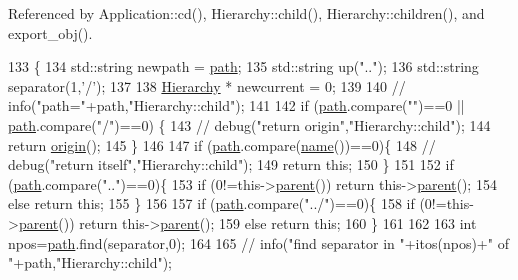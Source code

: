 Referenced by Application\+::cd(), Hierarchy\+::child(), Hierarchy\+::children(), and export\+\_\+obj().


\begin{DoxyCode}
133                                          \{
134   std::string newpath = \hyperlink{classHierarchy_aa7990fa7caf132d83e361ce033c6c65a}{path};
135   std::string up(\textcolor{stringliteral}{".."});
136   std::string separator(1,\textcolor{charliteral}{'/'});
137 
138   \hyperlink{classHierarchy}{Hierarchy} * newcurrent = 0;
139 
140   \textcolor{comment}{//  info("path="+path,"Hierarchy::child");}
141 
142   \textcolor{keywordflow}{if} (\hyperlink{classHierarchy_aa7990fa7caf132d83e361ce033c6c65a}{path}.compare(\textcolor{stringliteral}{""})==0 || \hyperlink{classHierarchy_aa7990fa7caf132d83e361ce033c6c65a}{path}.compare(\textcolor{stringliteral}{"/"})==0) \{
143     \textcolor{comment}{//    debug("return origin","Hierarchy::child");}
144     \textcolor{keywordflow}{return} \hyperlink{classHierarchy_aee461dc930ce3871636ff87f075b1b83}{origin}();
145   \}
146 
147   \textcolor{keywordflow}{if} (\hyperlink{classHierarchy_aa7990fa7caf132d83e361ce033c6c65a}{path}.compare(\hyperlink{classObject_a300f4c05dd468c7bb8b3c968868443c1}{name}())==0)\{
148     \textcolor{comment}{//    debug("return itself","Hierarchy::child");}
149     \textcolor{keywordflow}{return} \textcolor{keyword}{this};
150   \}
151 
152   \textcolor{keywordflow}{if} (\hyperlink{classHierarchy_aa7990fa7caf132d83e361ce033c6c65a}{path}.compare(\textcolor{stringliteral}{".."})==0)\{
153     \textcolor{keywordflow}{if} (0!=this->\hyperlink{classHierarchy_a1c7bec8257e717f9c1465e06ebf845fc}{parent}()) \textcolor{keywordflow}{return} this->\hyperlink{classHierarchy_a1c7bec8257e717f9c1465e06ebf845fc}{parent}();
154     \textcolor{keywordflow}{else} \textcolor{keywordflow}{return} \textcolor{keyword}{this};
155   \}
156 
157   \textcolor{keywordflow}{if} (\hyperlink{classHierarchy_aa7990fa7caf132d83e361ce033c6c65a}{path}.compare(\textcolor{stringliteral}{"../"})==0)\{
158     \textcolor{keywordflow}{if} (0!=this->\hyperlink{classHierarchy_a1c7bec8257e717f9c1465e06ebf845fc}{parent}()) \textcolor{keywordflow}{return} this->\hyperlink{classHierarchy_a1c7bec8257e717f9c1465e06ebf845fc}{parent}();
159     \textcolor{keywordflow}{else} \textcolor{keywordflow}{return} \textcolor{keyword}{this};
160   \}
161 
162 
163   \textcolor{keywordtype}{int} npos=\hyperlink{classHierarchy_aa7990fa7caf132d83e361ce033c6c65a}{path}.find(separator,0);
164 
165   \textcolor{comment}{//  info("find separator in "+itos(npos)+" of "+path,"Hierarchy::child");}

\end{DoxyCode}
